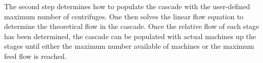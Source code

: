 \documentclass{anstrans}
\begin{document}
The second step determines how to populate the cascade with the user-defined
maximum number of centrifuges. One then solves the linear flow equation to
determine the theoretical flow in the cascade.
Once the relative flow of each stage has been determined, the
cascade can be populated with actual machines up the stages
until either the maximum number available of machines or the maximum feed
flow is reached.
\end{document}
